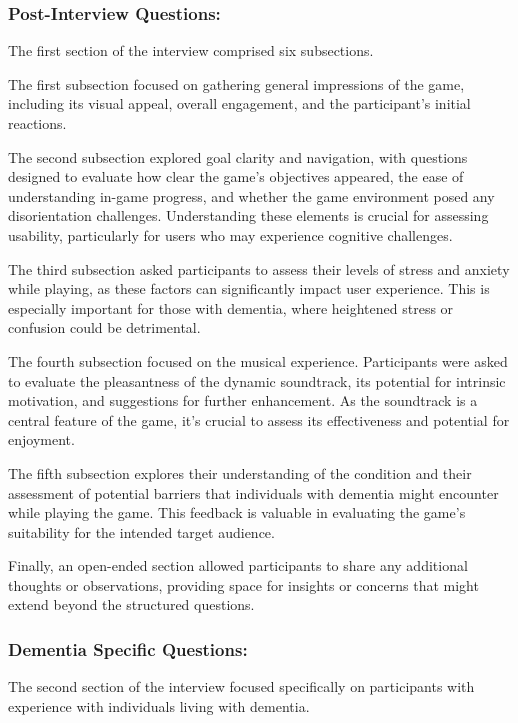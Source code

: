 \documentclass{l4proj}
\begin{document}
\subsubsection{Post-Interview Questions:}
The first section of the interview comprised six subsections. 

The first subsection focused on gathering general impressions of the game, including its visual appeal, overall engagement, and the participant's initial reactions.  %

The second subsection explored goal clarity and navigation, with questions designed to evaluate how clear the game's objectives appeared, the ease of understanding in-game progress, and whether the game environment posed any disorientation challenges.  Understanding these elements is crucial for assessing usability,  particularly for users who may experience cognitive challenges.  

The third subsection asked participants to assess their levels of stress and anxiety while playing, as these factors can significantly impact user experience. This is especially important for those with dementia, where heightened stress or confusion could be detrimental.

The fourth subsection focused on the musical experience. Participants were asked to evaluate the pleasantness of the dynamic soundtrack, its potential for intrinsic motivation, and suggestions for further enhancement. As the soundtrack is a central feature of the game, it's crucial to assess its effectiveness and potential  for enjoyment.  

The fifth subsection explores their understanding of the condition and their assessment of potential barriers that individuals with dementia might encounter while playing the game. This feedback is valuable in evaluating the game's suitability for the intended target audience.  

Finally, an open-ended section allowed participants to share any additional thoughts or observations, providing space for insights or concerns that might extend beyond the structured questions.

\subsubsection{Dementia Specific Questions:}
The second section of the interview focused specifically on participants with experience with individuals living with dementia. 
\end{document}

